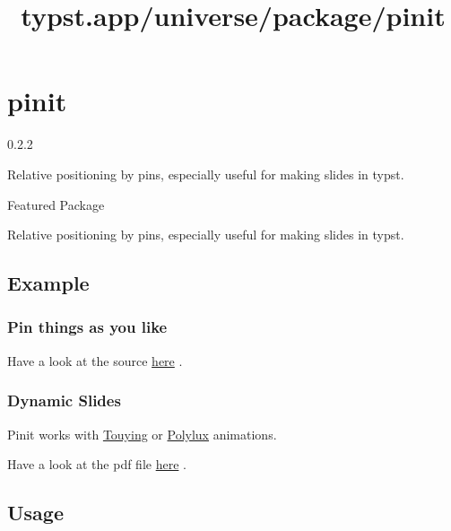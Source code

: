 \title{typst.app/universe/package/pinit}

\label{banner}
\section{pinit}\label{pinit}

{ 0.2.2 }

Relative positioning by pins, especially useful for making slides in
typst.

{ } Featured Package

\label{readme}
Relative positioning by pins, especially useful for making slides in
typst.

\subsection{Example}\label{example}

\subsubsection{Pin things as you like}\label{pin-things-as-you-like}

Have a look at the source
\href{https://github.com/typst/packages/raw/main/packages/preview/pinit/0.2.2/examples/example.typ}{here}
.


\subsubsection{Dynamic Slides}\label{dynamic-slides}

Pinit works with \href{https://github.com/touying-typ/touying}{Touying}
or \href{https://github.com/andreasKroepelin/polylux}{Polylux}
animations.

Have a look at the pdf file
\href{https://github.com/OrangeX4/typst-pinit/blob/main/examples/example.pdf}{here}
.


\subsection{Usage}\label{usage}

